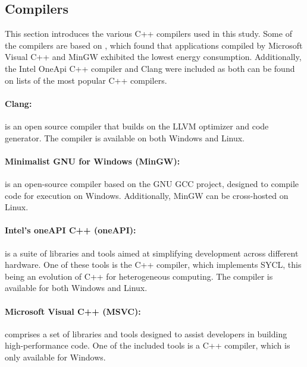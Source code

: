 \subsection{Compilers}

This section introduces the various C++ compilers used in this study. Some of the compilers are based on \cite{hassan2017}, which found that applications compiled by Microsoft Visual C++ and MinGW exhibited the lowest energy consumption. Additionally, the Intel OneApi C++ compiler and Clang were included as both can be found on lists of the most popular C++ compilers\cite{mycplus, educba, softwaretestinghelp}. 



\paragraph{Clang:} is an open source compiler that builds on the LLVM optimizer and code generator. The compiler is available on both Windows and Linux.\cite{clang}

\paragraph*{Minimalist GNU for Windows (MinGW):} is an open-source compiler based on the GNU GCC project, designed to compile code for execution on Windows. Additionally, MinGW can be cross-hosted on Linux.\cite{mingw}

\paragraph*{Intel's oneAPI C++ (oneAPI):}  is a suite of libraries and tools aimed at simplifying development across different hardware. One of these tools is the C++ compiler, which implements SYCL, this being an evolution of C++ for heterogeneous computing. The compiler is available for both Windows and Linux.\cite{oneapi}

\paragraph*{Microsoft Visual C++ (MSVC):}  comprises a set of libraries and tools designed to assist developers in building high-performance code. One of the included tools is a C++ compiler, which is only available for Windows\cite{msvc}.
